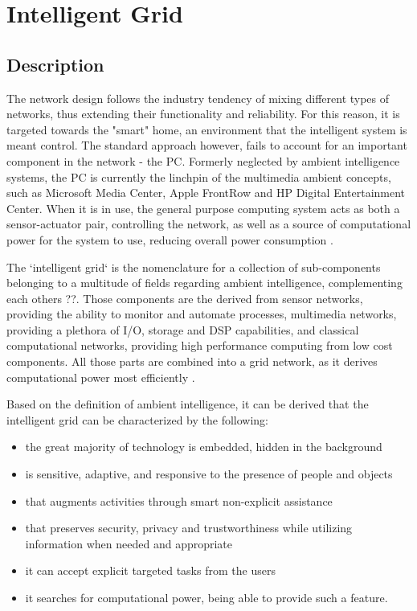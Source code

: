 \chapter{Intelligent Grid}

\section {Description}

The network design follows the industry tendency of mixing different types of networks, thus extending their functionality and reliability.
For this reason, it is targeted towards the "smart" home, an environment that the intelligent system is meant control. The standard
approach however, fails to account for an important component in the network - the PC. Formerly neglected by ambient intelligence systems,
the PC is currently the linchpin of the multimedia ambient concepts, such as Microsoft Media Center, Apple FrontRow and HP Digital 
Entertainment Center. When it is in use, the general purpose computing system acts as both a sensor-actuator pair, controlling the network,
as well as a source of computational power for the system to use, reducing overall power consumption \cite{95}.

The `intelligent grid` is the nomenclature for a collection of sub-components belonging to a multitude of fields regarding ambient intelligence,
complementing each others ??. Those components are the derived from sensor networks, providing the ability to monitor and automate processes,
multimedia networks, providing a plethora of I/O, storage and DSP capabilities, and classical computational networks, providing high performance
computing from low cost components. All those parts are combined into a grid network, as it derives computational power most efficiently
\cite{3, 8, 9, 19, 30, 32, 33, 38}.

Based on the definition of ambient intelligence, it can be derived that the intelligent grid can be characterized by the following:
\begin{itemize}
    \item the great majority of technology is embedded, hidden in the background 
    \item is sensitive, adaptive, and responsive to the presence of people and objects 
    \item that augments activities through smart non-explicit assistance 
    \item that preserves security, privacy and trustworthiness while utilizing information when needed and appropriate 
    \item it can accept explicit targeted tasks from the users 
    \item it searches for computational power, being able to provide such a feature. 
\end{itemize}

